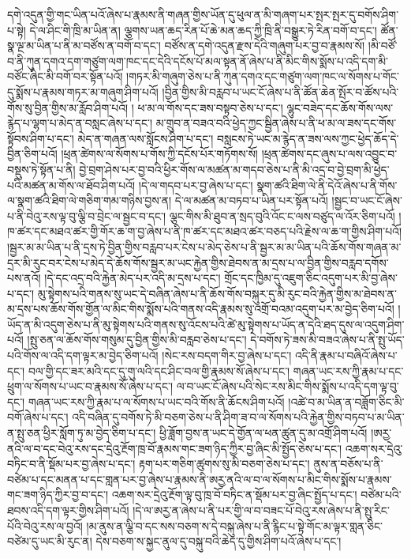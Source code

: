 དགེ་འདུན་གྱི་གང་ཡིན་པའོ་ཞེས་པ་རྣམས་ནི་གཞན་གྱིས་ཡོན་དུ་ཕུལ་ན་མི་གཞག་པར་སྤར་སྤར་དུ་བགོས་ཤིག་པ་སྟེ། དེ་ལ་ཤིང་གི་ཁྲི་མ་ཡིན་ན། ལྕགས་ཡན་ཆད་རིན་པོ་ཆེ་མན་ཆད་ཀྱི་ཁྲི་ནི་བསྒྱུར་ཏེ་རིན་བགོ་བ་དང་། ཚོན་སྣ་ལྔ་མ་ཡིན་པ་ནི་མ་བཙོས་ན་བགོ་བ་དང་། བཙོས་ན་དགེ་འདུན་རྫས་དེའི་གཞུག་པར་བྱ་བ་རྣམས་སོ། །མི་བཙོ་བ་ནི་ཀུན་དགའ་དག་གཙུག་ལག་ཁང་དང་དེའི་དངོས་པོ་མལ་སྟན་ནོ་ཞེས་པ་ནི་མིང་གིས་སྨོས་པ་འདི་དག་མི་བཙོང་ཞིང་མི་བགོ་བར་སྟོན་པའོ། །གཏར་མི་གཞུག་ཅེས་པ་ནི་ཀུན་དགའ་དང་གཙུག་ལག་ཁང་ལ་སོགས་པ་གོང་དུ་སྨོས་པ་རྣམས་གཏར་མ་གཞུག་ཤིག་པའོ། །བྱིན་གྱིས་མི་བརླབ་པ་ཡང་ངོ་ཞེས་པ་ནི་ཚོན་ཆེན་སྤོར་བ་ཚོས་པའི་གོས་སུ་བྱིན་གྱིས་མ་རློབ་ཤིག་པའོ། །
ཕ་མ་ལ་གོས་དང་ཟས་བསྟབ་ཅེས་པ་དང་། ལྷུང་བཟེད་དང་ཆོས་གོས་ལས་རྙེད་པ་ལྷག་པ་མེད་ན་བསླང་ཞེས་པ་དང་། མ་གྲུབ་ན་བཟའ་བའི་ཕྱེད་ཀྱང་སྦྱིན་ཞེས་པ་ནི་ཕ་མ་ལ་ཟས་དང་གོས་སྟོབས་ཤིག་པ་དང་། མེད་ན་གཞན་ལས་སློངས་ཤིག་པ་དང་། བསླངས་ཏེ་ཡང་མ་རྙེད་ན་ཟས་ལས་ཀྱང་ཕྱེད་ཆོད་དེ་བྱིན་ཅིག་པའོ། །ཕྲན་ཚེགས་ལ་སོགས་པ་གོས་ཀྱི་དངོས་པོར་གཏོགས་སོ། །ཕྲན་ཚེགས་དང་ཞུས་པ་ལས་འབྱུང་བ་བསྡུས་ཏེ་སྟོན་པ་ནི། བྱེ་བྲག་ཤེས་པར་བྱ་བའི་ཕྱིར་གོས་ལ་མཚན་མ་གདབ་ཅེས་པ་ནི་མི་འདྲ་བ་བྱེ་བྲག་མི་ཕྱེད་པའི་མཚན་མ་གོས་ལ་ཐོབ་ཤིག་པའོ། །དེ་ལ་གདབ་པར་བྱ་ཞེས་པ་དང་། སྣག་ཚའི་ཐིག་ལེ་ནི་དེའོ་ཞེས་པ་ནི་གོས་ལ་སྣག་ཚའི་ཐིག་ལེ་གཅིག་གམ་གཉིས་བྱས་ན། དེ་ལ་མཚན་མ་བཏབ་པ་ཡིན་པར་སྟོན་པའོ། །སྦྱང་བ་ཡང་ངོ་ཞེས་པ་ནི་བེའུ་རས་ལྟ་བུ་ལྕི་བ་བྲེང་ལ་སྦྱང་བ་དང་། ལྕང་གིས་མི་ཐུབ་ན་སྲད་བུའི་འོང་ང་ལས་བཙུད་ལ་འོར་ཅིག་པའོ། །ཁ་ཚར་དང་མཐའ་ཚར་གྱི་གོར་ཆ་ག་བྱ་ཞེས་པ་ནི་ཁ་ཚར་དང་མཐའ་ཚར་བཅད་པའི་རྗེས་ལ་ཆ་ག་གྱིས་ཤིག་པའོ། །སྦྱར་མ་མ་ཡིན་པ་ནི་དྲས་ཏེ་བྱིན་གྱིས་བརླབ་པར་ངེས་པ་མེད་ཅེས་པ་ནི་སྦྱར་མ་མ་ཡིན་པའི་ཆོས་གོས་གཞན་མ་དྲར་མི་རུང་བར་ངེས་པ་མེད་དེ་ཆོས་གོས་སྦྱར་མ་ཡང་རྐྱེན་གྱིས་ཐེབས་ན་མ་དྲས་པ་ལ་བྱིན་གྱིས་བརླབ་དགོས་པས་ནའོ། །དེ་དང་འདྲ་བའི་རྐྱེན་མེད་པར་འདི་མ་དྲས་པ་དང་། གྲོང་དང་ཁྱིམ་དུ་འཇུག་ཅིང་འདུག་པར་མི་བྱ་ཞེས་པ་དང་། མུ་སྟེགས་པའི་གནས་སུ་ཡང་དེ་བཞིན་ཞེས་པ་ནི་ཆོས་གོས་བསྐུར་དུ་མི་རུང་བའི་རྐྱེན་གྱིས་མ་ཐེབས་ན་མ་དྲས་པས་ཆོས་གོས་གྱོན་ལ་མིང་གིས་སྨོས་པའི་གནས་འདི་རྣམས་སུ་འགྲོ་བའམ་འདུག་པར་མ་བྱེད་ཅིག་པའོ། །ཡོད་ན་མི་འདུག་ཅེས་པ་ནི་མུ་སྟེགས་པའི་གནས་སུ་འོངས་པའི་ཚེ་མུ་སྟེགས་པ་ཡོད་ན་དེའི་ཐད་དུས་ལ་འདུག་ཤིག་པའོ། །སྤུ་ཅན་ལ་ཆོས་གོས་གསུམ་དུ་བྱིན་གྱིས་མི་བརླབ་ཅེས་པ་དང་། དེ་བགོས་ཏེ་ཟས་མི་བཟའ་ཞེས་པ་ནི་སྤུ་ཡོད་པའི་གོས་ལ་འདི་དག་ལྟར་མ་བྱེད་ཅིག་པའོ། །སེང་རས་བདག་གིར་བྱ་ཞེས་པ་དང་། འདི་ནི་རྣམ་པ་བཞིའོ་ཞེས་པ་དང་། བལ་གྱི་དང་ཟར་མའི་དང་དུ་གུ་ལའི་དང་ཤིང་བལ་གྱི་རྣམས་སོ་ཞེས་པ་དང་། གཞན་ཡང་རས་ཀྱི་རྣམ་པ་དང་ཕྲུག་ལ་སོགས་པ་ཡང་བ་རྣམས་སོ་ཞེས་པ་དང་། ལ་བ་ཡང་ངོ་ཞེས་པའི་སེང་རས་མིང་གིས་སྨོས་པ་འདི་དག་ལྟ་བུ་དང་། གཞན་ཡང་རས་ཀྱི་རྣམ་པ་ལ་སོགས་པ་ཡང་བའི་གོས་ནི་ཆོངས་ཤིག་པའོ། །འཚེ་བ་མ་ཡིན་ན་བཟློག་ཅིང་མི་བགོ་ཞེས་པ་དང་། འདི་བཞིན་དུ་བགོས་ཏེ་མི་བཅག་ཅེས་པ་ནི་ཤིག་ཟ་བ་ལ་སོགས་པའི་རྐྱེན་གྱིས་བཏབ་པ་མ་ཡིན་ན་སྤུ་ཅན་ཕྱིར་སློག་ཏུ་མ་བྱེད་ཅིག་པ་དང་། ཕྱི་ཟློག་བྱས་ན་ཡང་དེ་གྱོན་ལ་ཕན་ཚུན་དུ་མ་འགྲོ་ཤིག་པའོ། །ཨརྱ་ནའི་ལ་བ་དང་བེའུ་རས་དང་དྲེའུ་རྔོག་ཁྲ་བོ་རྣམས་གང་ཟག་ཉིད་ཀྱིར་བྱ་ཞིང་མི་སྤྱོད་ཅེས་པ་དང་། འཆག་སར་དྲེའུ་བཏིང་བ་ནི་སྡོམ་པར་བྱ་ཞེས་པ་དང་། རྟག་པར་གཅིག་ཚུགས་སུ་མི་བཅག་ཅེས་པ་དང་། ནུས་ན་བཅོས་པ་ནི་བཙེམ་པ་དང་མནན་པ་དང་གླན་པར་བྱ་ཞེས་པ་རྣམས་ནི་ཨརྱ་ནའི་ལ་བ་ལ་སོགས་པ་མིང་གིས་སྨོས་པ་རྣམས་གང་ཟག་ཉིད་ཀྱིར་བྱ་བ་དང་། འཆག་སར་དྲེའུ་རྔོག་ལྟ་བུ་ཁྲ་བོ་བཏིང་ན་སྡོམ་པར་བྱ་ཞིང་སྤྱོད་པ་དང་། བཙེམ་པའི་ཐབས་འདི་དག་ལྟར་གྱིས་ཤིག་པའོ། །དེ་ལ་ཨརྱ་ན་ཞེས་པ་ནི་པར་གྱི་ལ་བ་བཟང་པོ་བེའུ་རས་ཞེས་པ་ནི་སྤུ་རིང་པོའི་བེའུ་རས་ལ་བྱའོ། །མ་ནུས་ན་ལྕི་བ་དང་སས་བཅག་ས་དེ་བསྐུ་ཞེས་པ་ནི་རྙིང་པ་སྟེ་གོང་མ་ལྟར་གླན་ཅིང་བཙེམ་དུ་ཡང་མི་རུང་ན། དེས་བཅག་ས་སྐྱང་ནུལ་དུ་བསྐུ་བའི་ཆེད་དུ་གྱིས་ཤིག་པའོ་ཞེས་པ་དང་། 